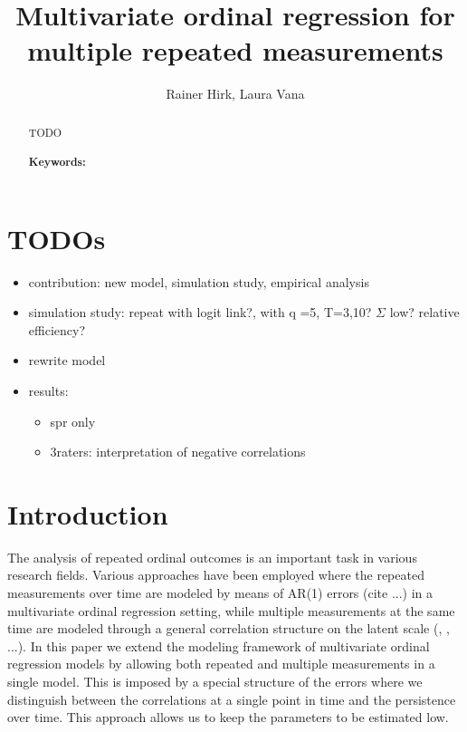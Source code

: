\documentclass{article}
\title{Multivariate ordinal regression for multiple repeated measurements}
\author{Rainer Hirk, Laura Vana}
\begin{document}




\maketitle


\begin{abstract}
TODO
	\\ \ \\ \textbf{Keywords: }

\end{abstract}

\section*{TODOs}
\begin{itemize}
\item contribution: new model, simulation study, empirical analysis
\item simulation study: repeat with logit link?, with q =5, T=3,10? $\Sigma$ low? relative efficiency?
\item rewrite model
\item results:
\begin{itemize}
\item spr only
\item 3raters: interpretation of negative correlations
\end{itemize}
\end{itemize}

\section{Introduction}
The analysis of repeated ordinal outcomes is an important task in various research fields. Various approaches have been employed where the repeated measurements over time are modeled by means of AR(1) errors (cite ...) in a multivariate ordinal regression setting, while multiple measurements at the same time are modeled through a general correlation structure on the latent scale (\cite{Scott02}, \cite{pub:Hirk+Hornik+Vana:2018a}, ...). In this paper we extend the modeling framework of multivariate ordinal regression models by allowing both repeated and multiple measurements in a single model.
This is imposed by a special structure of the errors where we distinguish between the correlations at a single point in time and the persistence over time. This approach allows us to keep the parameters to be estimated low.
\\
\end{document}
